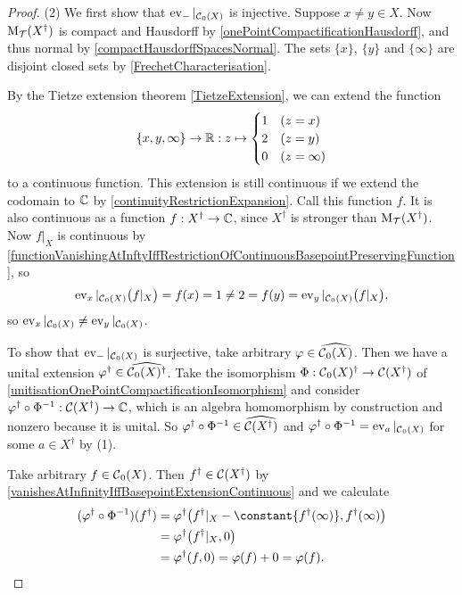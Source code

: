 \begin{proof}
(2) We first show that $\operatorname{ev}_{-}|_{\operatorname{\mathcal{C}}_0(X)}$ is injective. Suppose $x\neq y \in X$. Now $\operatorname{M_\mathcal{T}}(X^\dagger)$ is compact and Hausdorff by \ref{onePointCompactificationHausdorff}, and thus normal by \ref{compactHausdorffSpacesNormal}. The sets $\{x\}$, $\{y\}$ and $\{\infty\}$ are disjoint closed sets by \ref{FrechetCharacterisation}.

By the Tietze extension theorem \ref{TietzeExtension}, we can extend the function
\[ \{x, y, \infty\}\to \mathbb{R}: z\mapsto \begin{cases}
1 & (z = x) \\ 2 & (z = y) \\ 0 & (z = \infty)
\end{cases} \]
to a continuous function. This extension is still continuous if we extend the codomain to $\mathbb{C}$ by \ref{continuityRestrictionExpansion}. Call this function $f$. It is also continuous as a function $f: X^\dagger \to \mathbb{C}$, since $X^\dagger$ is stronger than $\operatorname{M_\mathcal{T}}(X^\dagger)$. Now $f|_X$ is continuous by \ref{functionVanishingAtInftyIffRestrictionOfContinuousBasepointPreservingFunction}, so 
\[ \operatorname{ev}_x|_{\operatorname{\mathcal{C}}_0(X)}\big(f|_X\big) = f(x) = 1 \neq 2 = f(y) = \operatorname{ev}_y|_{\operatorname{\mathcal{C}}_0(X)}\big(f|_X\big), \]
so $\operatorname{ev}_x|_{\operatorname{\mathcal{C}}_0(X)} \neq \operatorname{ev}_y|_{\operatorname{\mathcal{C}}_0(X)}$.

To show that $\operatorname{ev}_{-}|_{\operatorname{\mathcal{C}}_0(X)}$ is surjective, take arbitrary $\varphi\in\widehat{\operatorname{\mathcal{C}}_0(X)}$. Then we have a unital extension $\varphi^\dagger\in \widehat{\operatorname{\mathcal{C}}_0(X)^\dagger}$. Take the isomorphism $\Phi: \operatorname{\mathcal{C}}_0(X)^\dagger \to \operatorname{\mathcal{C}}(X^\dagger)$ of \ref{unitisationOnePointCompactificationIsomorphism} and consider $\varphi^\dagger\circ \Phi^{-1}: \operatorname{\mathcal{C}}(X^\dagger)\to \mathbb{C}$, which is an algebra homomorphism by construction and nonzero because it is unital. So $\varphi^\dagger\circ \Phi^{-1}\in \widehat{\operatorname{\mathcal{C}}(X^\dagger)}$ and $\varphi^\dagger\circ \Phi^{-1} = \operatorname{ev}_a|_{\operatorname{\mathcal{C}}_0(X)}$ for some $a\in X^\dagger$ by (1).

Take arbitrary $f\in \operatorname{\mathcal{C}}_0(X)$. Then $f^\dagger \in \operatorname{\mathcal{C}}(X^\dagger)$ by \ref{vanishesAtInfinityIffBasepointExtensionContinuous} and we calculate
\begin{align*}
(\varphi^\dagger\circ \Phi^{-1})(f^\dagger) &= \varphi^\dagger\big(f^\dagger|_X - \constant{f^\dagger(\infty)}, f^\dagger(\infty)\big) \\
&= \varphi^\dagger\big(f^\dagger|_X, 0\big) \\
&= \varphi^\dagger(f, 0) = \varphi(f) + 0 = \varphi(f).
\end{align*}


\end{proof}
